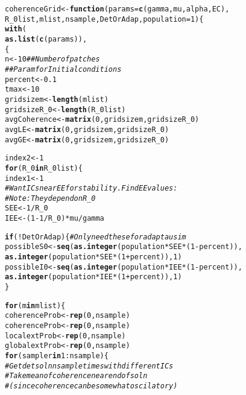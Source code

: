 \documentclass{article}\usepackage[]{graphicx}\usepackage[]{color}
\makeatletter
\newcommand{\hlnum}[1]{\textcolor[rgb]{0.686,0.059,0.569}{#1}}%
\newcommand{\hlcom}[1]{\textcolor[rgb]{0.678,0.584,0.686}{\textit{#1}}}%
\newcommand{\hlopt}[1]{\textcolor[rgb]{0,0,0}{#1}}%
\newcommand{\hlstd}[1]{\textcolor[rgb]{0.345,0.345,0.345}{#1}}%
\newcommand{\hlkwa}[1]{\textcolor[rgb]{0.161,0.373,0.58}{\textbf{#1}}}%
\newcommand{\hlkwb}[1]{\textcolor[rgb]{0.69,0.353,0.396}{#1}}%
\newcommand{\hlkwc}[1]{\textcolor[rgb]{0.333,0.667,0.333}{#1}}%
\newcommand{\hlkwd}[1]{\textcolor[rgb]{0.737,0.353,0.396}{\textbf{#1}}}%
\newenvironment{kframe}{%
 \def\at@end@of@kframe{}%
 \ifinner\ifhmode%
  \def\at@end@of@kframe{\end{minipage}}%
  \begin{minipage}{\columnwidth}%
 \fi\fi%
 \def\FrameCommand##1{\hskip\@totalleftmargin \hskip-\fboxsep
 \colorbox{shadecolor}{##1}\hskip-\fboxsep
     \hskip-\linewidth \hskip-\@totalleftmargin \hskip\columnwidth}%
 \MakeFramed {\advance\hsize-\width
   \@totalleftmargin\z@ \linewidth\hsize
   \@setminipage}}%
 {\par\unskip\endMakeFramed%
 \at@end@of@kframe}
\newenvironment{knitrout}{}{} %
\makeatother
\begin{document}
\begin{knitrout}
\color{fgcolor}\begin{kframe}
\begin{alltt}
\hlstd{coherenceGrid} \hlkwb{<-} \hlkwa{function}\hlstd{(}\hlkwc{params}\hlstd{=}\hlkwd{c}\hlstd{(gamma,mu,alpha,EC),}
                            \hlkwc{R_0list}\hlstd{,}\hlkwc{mlist}\hlstd{,}\hlkwc{nsample}\hlstd{,}\hlkwc{DetOrAdap}\hlstd{,}\hlkwc{population}\hlstd{=}\hlnum{1}\hlstd{)\{}
  \hlkwd{with}\hlstd{(}
       \hlkwd{as.list}\hlstd{(}\hlkwd{c}\hlstd{(params)),}
       \hlstd{\{}
  \hlstd{n} \hlkwb{<-} \hlnum{10}  \hlcom{## Number of patches}
  \hlcom{##Param for Initial conditions}
   \hlstd{percent} \hlkwb{<-} \hlnum{0.1}
  \hlstd{tmax} \hlkwb{<-} \hlnum{10}
  \hlstd{gridsizem}\hlkwb{<-}\hlkwd{length}\hlstd{(mlist)}
  \hlstd{gridsizeR_0} \hlkwb{<-} \hlkwd{length}\hlstd{(R_0list)}
  \hlstd{avgCoherence}\hlkwb{<-} \hlkwd{matrix}\hlstd{(}\hlnum{0}\hlstd{, gridsizem,gridsizeR_0)}
  \hlstd{avgLE}\hlkwb{<-} \hlkwd{matrix}\hlstd{(}\hlnum{0}\hlstd{, gridsizem,gridsizeR_0)}
  \hlstd{avgGE}\hlkwb{<-} \hlkwd{matrix}\hlstd{(}\hlnum{0}\hlstd{, gridsizem,gridsizeR_0)}

  \hlstd{index2} \hlkwb{<-} \hlnum{1}
  \hlkwa{for} \hlstd{(R_0} \hlkwa{in} \hlstd{R_0list)\{}
    \hlstd{index1} \hlkwb{<-} \hlnum{1}
     \hlcom{#Want ICs near EE for stability. Find EE values:}
     \hlcom{#Note: They depend on R_0}
     \hlstd{SEE} \hlkwb{<-}\hlnum{1}\hlopt{/}\hlstd{R_0}
     \hlstd{IEE} \hlkwb{<-}\hlstd{(}\hlnum{1} \hlopt{-} \hlnum{1}\hlopt{/}\hlstd{R_0)}\hlopt{*}\hlstd{mu}\hlopt{/}\hlstd{gamma}

     \hlkwa{if}\hlstd{(}\hlopt{!}\hlstd{DetOrAdap)\{} \hlcom{#Only need these for adaptau sim}
        \hlstd{possibleS0} \hlkwb{<-} \hlkwd{seq}\hlstd{(}\hlkwd{as.integer}\hlstd{(population}\hlopt{*}\hlstd{SEE}\hlopt{*}\hlstd{(}\hlnum{1}\hlopt{-}\hlstd{percent)),}
                          \hlkwd{as.integer}\hlstd{(population}\hlopt{*}\hlstd{SEE}\hlopt{*}\hlstd{(}\hlnum{1}\hlopt{+}\hlstd{percent)),}\hlnum{1}\hlstd{)}
        \hlstd{possibleI0} \hlkwb{<-} \hlkwd{seq}\hlstd{(}\hlkwd{as.integer}\hlstd{(population}\hlopt{*}\hlstd{IEE}\hlopt{*}\hlstd{(}\hlnum{1}\hlopt{-}\hlstd{percent)),}
                          \hlkwd{as.integer}\hlstd{(population}\hlopt{*}\hlstd{IEE}\hlopt{*}\hlstd{(}\hlnum{1}\hlopt{+}\hlstd{percent)),}\hlnum{1}\hlstd{)}
     \hlstd{\}}

      \hlkwa{for} \hlstd{(m} \hlkwa{in} \hlstd{mlist)\{}
        \hlstd{coherenceProb} \hlkwb{<-} \hlkwd{rep}\hlstd{(}\hlnum{0}\hlstd{, nsample)}
        \hlstd{coherenceProb} \hlkwb{<-} \hlkwd{rep}\hlstd{(}\hlnum{0}\hlstd{, nsample)}
        \hlstd{localextProb} \hlkwb{<-} \hlkwd{rep}\hlstd{(}\hlnum{0}\hlstd{, nsample)}
        \hlstd{globalextProb} \hlkwb{<-} \hlkwd{rep}\hlstd{(}\hlnum{0}\hlstd{, nsample)}
        \hlkwa{for} \hlstd{(sampler} \hlkwa{in} \hlnum{1}\hlopt{:}\hlstd{nsample)\{}
         \hlcom{#Get det soln nsample times with different ICs}
         \hlcom{#Take mean of coherence near end of soln}
         \hlcom{#(since coherence can be somewhat oscilatory)}


\end{alltt}
\end{kframe}
\end{knitrout}
\end{document}
